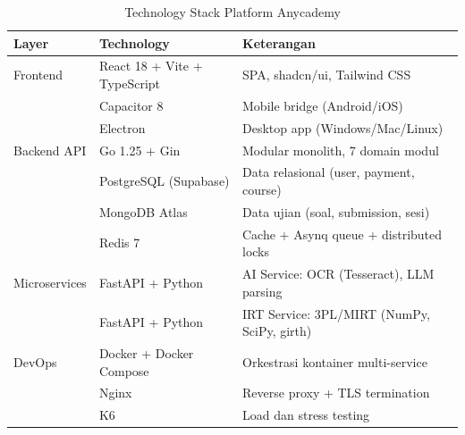 \begin{table}[H]
	\centering
	\caption{Technology Stack Platform Anycademy}
	\label{tab:tech-stack}
	\begin{tabular}{|l|l|l|}
		\hline
		\textbf{Layer} & \textbf{Technology}          & \textbf{Keterangan}                         \\
		\hline
		Frontend       & React 18 + Vite + TypeScript & SPA, shadcn/ui, Tailwind CSS                \\
		               & Capacitor 8                  & Mobile bridge (Android/iOS)                 \\
		               & Electron                     & Desktop app (Windows/Mac/Linux)             \\
		\hline
		Backend API    & Go 1.25 + Gin                & Modular monolith, 7 domain modul            \\
		               & PostgreSQL (Supabase)        & Data relasional (user, payment, course)     \\
		               & MongoDB Atlas                & Data ujian (soal, submission, sesi)         \\
		               & Redis 7                      & Cache + Asynq queue + distributed locks     \\
		\hline
		Microservices  & FastAPI + Python             & AI Service: OCR (Tesseract), LLM parsing    \\
		               & FastAPI + Python             & IRT Service: 3PL/MIRT (NumPy, SciPy, girth) \\
		\hline
		DevOps         & Docker + Docker Compose      & Orkestrasi kontainer multi-service          \\
		               & Nginx                        & Reverse proxy + TLS termination             \\
		               & K6                           & Load dan stress testing                     \\
		\hline
	\end{tabular}
\end{table}
